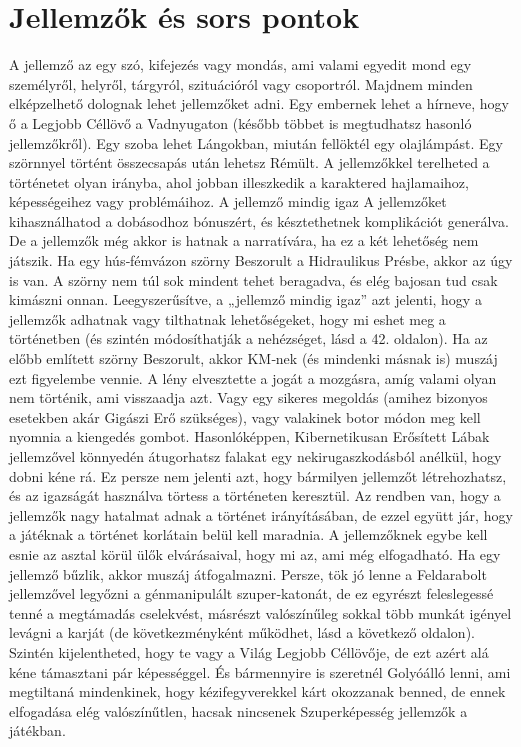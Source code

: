 \documentclass[oneside]{book}
\begin{document}
\chapter{Jellemzők és sors pontok}
A jellemző az egy szó, kifejezés vagy mondás, ami valami egyedit mond egy személyről, helyről, tárgyról, szituációról vagy csoportról. Majdnem minden elképzelhető dolognak lehet jellemzőket adni. Egy embernek lehet a hírneve, hogy ő a Legjobb Céllövő a Vadnyugaton (később többet is megtudhatsz hasonló jellemzőkről). Egy szoba lehet Lángokban, miután fellöktél egy olajlámpást. Egy szörnnyel történt összecsapás után lehetsz Rémült. A jellemzőkkel terelheted a történetet olyan irányba, ahol jobban illeszkedik a karaktered hajlamaihoz, képességeihez vagy problémáihoz.
A jellemző mindig igaz
A jellemzőket kihasználhatod a dobásodhoz bónuszért, és késztethetnek komplikációt generálva. De a jellemzők még akkor is hatnak a narratívára, ha ez a két lehetőség nem játszik. Ha egy hús‑fémvázon szörny Beszorult a Hidraulikus Présbe, akkor az úgy is van. A szörny nem túl sok mindent tehet beragadva, és elég bajosan tud csak kimászni onnan.
Leegyszerűsítve, a „jellemző mindig igaz” azt jelenti, hogy a jellemzők adhatnak vagy tilthatnak lehetőségeket, hogy mi eshet meg a történetben (és szintén módosíthatják a nehézséget, lásd a 42. oldalon). Ha az előbb említett szörny Beszorult, akkor KM‑nek (és mindenki másnak is) muszáj ezt figyelembe vennie. A lény elvesztette a jogát a mozgásra, amíg valami olyan nem történik, ami visszaadja azt. Vagy egy sikeres megoldás (amihez bizonyos esetekben akár Gigászi Erő szükséges), vagy valakinek botor módon meg kell nyomnia a kiengedés gombot. Hasonlóképpen, Kibernetikusan Erősített Lábak jellemzővel könnyedén átugorhatsz falakat egy nekirugaszkodásból anélkül, hogy dobni kéne rá.
Ez persze nem jelenti azt, hogy bármilyen jellemzőt létrehozhatsz, és az igazságát használva törtess a történeten keresztül. Az rendben van, hogy a jellemzők nagy hatalmat adnak a történet irányításában, de ezzel együtt jár, hogy a játéknak a történet korlátain belül kell maradnia. A jellemzőknek egybe kell esnie az asztal körül ülők elvárásaival, hogy mi az, ami még elfogadható. Ha egy jellemző bűzlik, akkor muszáj átfogalmazni.
Persze, tök jó lenne a Feldarabolt jellemzővel legyőzni a génmanipulált szuper‑katonát, de ez egyrészt feleslegessé tenné a megtámadás cselekvést, másrészt valószínűleg sokkal több munkát igényel levágni a karját (de következményként működhet, lásd a következő oldalon). Szintén kijelentheted, hogy te vagy a Világ Legjobb Céllövője, de ezt azért alá kéne támasztani pár képességgel. És bármennyire is szeretnél Golyóálló lenni, ami megtiltaná mindenkinek, hogy kézifegyverekkel kárt okozzanak benned, de ennek elfogadása elég valószínűtlen, hacsak nincsenek Szuperképesség jellemzők a játékban.
\end{document}
